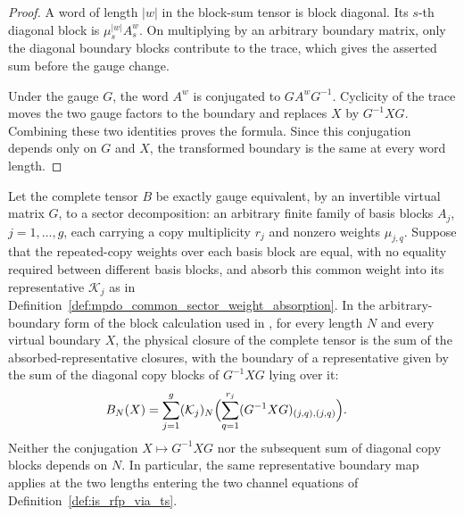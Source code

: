 \begin{proof}\leanok
    A word of length $|w|$ in the block-sum tensor is block diagonal. Its
    $s$-th diagonal block is $\mu_s^{|w|}A_s^w$. On multiplying by an
    arbitrary boundary matrix, only the diagonal boundary blocks contribute
    to the trace, which gives the asserted sum before the gauge change.

    Under the gauge $G$, the word $A^w$ is conjugated to $GA^wG^{-1}$.
    Cyclicity of the trace moves the two gauge factors to the boundary and
    replaces $X$ by $G^{-1}XG$. Combining these two identities proves the
    formula. Since this conjugation depends only on $G$ and $X$, the
    transformed boundary is the same at every word length.
\end{proof}

\begin{lemma}
    \label{thm:mpdo_absorbed_representative_boundary_decomposition}
    \leanok
    Let the complete tensor $B$ be exactly gauge equivalent, by an invertible
    virtual matrix $G$, to a sector decomposition: an arbitrary finite family
    of basis blocks $A_j$, $j=1,\ldots,g$, each carrying a copy multiplicity
    $r_j$ and nonzero weights $\mu_{j,q}$. Suppose that the
    repeated-copy weights over each basis block are equal, with no equality
    required between different basis blocks, and absorb this common weight
    into its representative $\mathcal K_j$ as in
    Definition~\ref{def:mpdo_common_sector_weight_absorption}. In the
    arbitrary-boundary form of the block calculation used in
    \cite[lines~186--195 and Appendix~C.2, lines~1646--1665 and 1810--1825]
    {Cirac2016MPDO_arXiv}, for every length $N$ and every virtual boundary $X$,
    the physical closure of the complete tensor is the sum of the
    absorbed-representative closures, with the boundary of a representative
    given by the sum of the diagonal copy blocks of $G^{-1}XG$ lying over it:
    \begin{align}
        B_N(X)
         & =
        \sum_{j=1}^g (\mathcal K_j)_N\Bigl(\sum_{q=1}^{r_j}
            (G^{-1}XG)_{(j,q),(j,q)}\Bigr).
        \notag
    \end{align}
    Neither the conjugation $X\mapsto G^{-1}XG$ nor the subsequent sum of
    diagonal copy blocks depends on $N$. In particular, the same
    representative boundary map applies at the two lengths entering the two
    channel equations of Definition~\ref{def:is_rfp_via_ts}.
\end{lemma}

